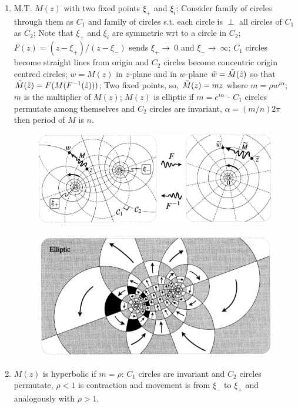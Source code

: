 \documentclass[12pt]{article}
\newcommand{\rto}{\rightarrow\ }
\def\td{\ensuremath\tilde}
\def\td{\ensuremath\tilde}
\begin{document}
\begin{enumerate}
    \item M.T. $M(z)$ with two fixed points $\xi_{+}$ and $\xi_i$; Consider family of circles through them as $C_1$ and family of circles s.t. each circle is $\perp$ all circles of $C_1$ as $C_2$; Note that $\xi_+$ and $\xi_i$ are symmetric wrt to a circle in $C_2$; $F(z) = (z-\xi_+)/(z-\xi_{-})$ sends $\xi_+ \rto 0$ and $\xi_{-}\rto \infty$; $C_1$ circles become straight lines from origin and $C_2$ circles become concentric origin centred circles; $w = M(z)$ in $z$-plane and in $w$-plane $\td{w}=\td{M}(\td{z})$ so that $\td{M}(\td{z}) = F(M(F^{-1}(\td{z})))$; Two fixed points, so, $\td{M}(z) = m z$ where $m = \rho w^{i\alpha}$; $m$ is the multiplier of $M(z)$; $M(z)$ is elliptic if $m = e^{i\alpha}$ - $C_1$ circles permutate among themselves and $C_2$ circles are invariant, $\alpha = (m/n)2\pi$ then period of $M$ is $n$.

    \begin{figure}[h!]
        \centering
        \includegraphics[scale=0.7]{fig_20}
        \label{f20}
    \end{figure}

    \begin{figure}[h!]
        \centering
        \includegraphics[scale=0.7]{fig_21}
        \label{f21}
    \end{figure}
    
    \item $M(z)$ is hyperbolic if $m = \rho$: $C_1$ circles are invariant and $C_2$ circles permutate, $\rho < 1$ is contraction and movement is from $\xi_{-}$ to $\xi_{+}$ and analogously with $\rho > 1$.
    

\end{enumerate}
\end{document}
